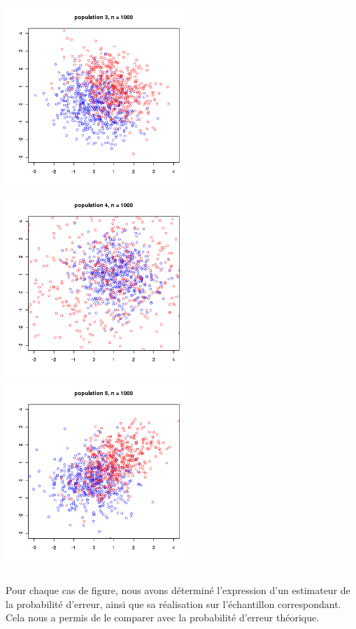 \documentclass[a4paper, 10pt]{article}
\begin{document}
\includegraphics[height = 7cm, width = 7cm]{plots/exo1_simul_3.png}
\includegraphics[height = 7cm, width = 7cm]{plots/exo1_simul_4.png}\\
\includegraphics[height = 7cm, width = 7cm]{plots/exo1_simul_5.png}\\ \\

Pour chaque cas de figure, nous avons déterminé l'expression d'un estimateur de la probabilité d'erreur,
ainsi que sa réalisation sur l'échantillon correspondant.\\
Cela nous a permis de le comparer avec la probabilité d'erreur théorique.\\
\end{document}
